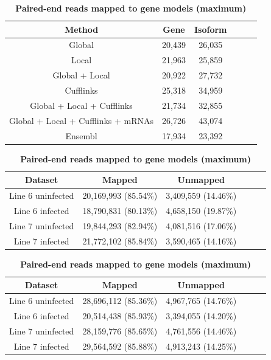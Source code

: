\documentclass[10pt]{article}
\begin{document}
\begin{table}[!ht]
\caption{
\bf{Number of putative genes and isoforms}}
\begin{tabular}{cccccc}
\hline
Method& Gene & Isoform \\ 
\hline
Global & 20,439 & 26,035 \\
Local & 21,963 & 25,859 \\
Global + Local & 20,922 & 27,732 \\
Cufflinks & 25,318 & 34,959 \\
Global + Local + Cufflinks & 21,734 & 32,855 \\
Global + Local + Cufflinks + mRNAs & 26,726 & 43,074\\
Ensembl & 17,934 & 23,392 \\
\hline
\end{tabular}
\label{genes_transcripts}

\caption{
\bf{Single-end reads mapped to gene models (maximum)}}
\begin{tabular}{cccccc}
\hline
Dataset & Mapped & Unmapped \\
\hline
Line 6 uninfected & 20,169,993 (85.54\%) & 3,409,559 (14.46\%) \\
Line 6 infected & 18,790,831 (80.13\%) & 4,658,150 (19.87\%) \\
Line 7 uninfected & 19,844,293 (82.94\%) & 4,081,516 (17.06\%) \\
Line 7 infected & 21,772,102 (85.84\%) & 3,590,465 (14.16\%) \\
\hline
\end{tabular}
\label{single-end_map}

\caption{
\bf{Paired-end reads mapped to gene models (maximum)}}
\begin{tabular}{cccccc}
\hline
Dataset & Mapped & Unmapped \\
\hline
Line 6 uninfected & 28,696,112 (85.36\%) & 4,967,765 (14.76\%) \\
Line 6 infected & 20,514,438 (85.93\%) & 3,394,055 (14.20\%) \\
Line 7 uninfected & 28,159,776 (85.65\%) & 4,761,556 (14.46\%) \\
Line 7 infected & 29,564,592 (85.88\%) & 4,913,243 (14.25\%) \\
\hline
\end{tabular}
\label{paired-end_map}
\end{table}
\end{document}
